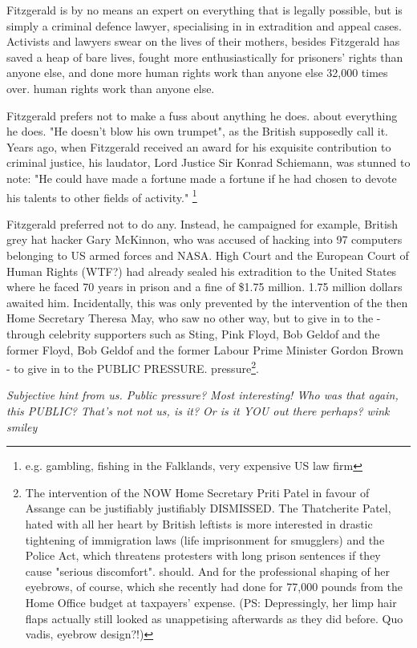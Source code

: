 \begin{multicols}{2}
Fitzgerald is by no means an expert on everything that is legally
possible, but is simply a criminal defence lawyer, specialising in
in extradition and appeal cases. Activists and
lawyers swear on the lives of their mothers, besides
Fitzgerald has saved a heap of bare lives, fought more enthusiastically for prisoners' rights than anyone else, and done more human rights work than anyone else 32,000 times over.
human rights work than anyone else.

Fitzgerald prefers not to make a fuss about anything he does.
about everything he does. "He doesn't blow his own trumpet", as the British supposedly call it. Years ago, when Fitzgerald received an award for his exquisite
contribution to criminal justice, his laudator, Lord
Justice Sir Konrad Schiemann, was stunned to note: "He could have made a fortune
made a fortune if he had chosen to devote his talents to other fields of activity."
\footnote[12]{e.g. gambling, fishing in the Falklands, very expensive US law firm}

Fitzgerald preferred not to do any. Instead, he campaigned
for example, British grey hat hacker Gary McKinnon, who was accused of hacking into 97 computers belonging to
US armed forces and NASA. High
Court and the European Court of Human Rights (WTF?) had already sealed his extradition to the United States
where he faced 70 years in prison and a fine of \$1.75 million.
1.75 million dollars awaited him. Incidentally, this was only prevented by the intervention of the then Home Secretary Theresa May, who saw no other way,
but to give in to the - through celebrity supporters such as Sting, Pink Floyd, Bob Geldof and the former
Floyd, Bob Geldof and the former Labour Prime Minister Gordon Brown - to give in to the PUBLIC PRESSURE.
pressure\footnote[13]{The intervention of the NOW Home Secretary Priti Patel in favour of Assange can be justifiably
justifiably DISMISSED. The Thatcherite Patel, hated with all her heart by British leftists
is more interested in drastic tightening of immigration laws (life imprisonment for smugglers) and the Police Act, which threatens protesters with long prison sentences if they cause "serious discomfort".
should. And for the professional shaping of her eyebrows, of course, which she recently had done for 77,000 pounds
from the Home Office budget at taxpayers' expense.
(PS: Depressingly, her limp hair flaps actually still looked as unappetising afterwards as they did before. Quo vadis, eyebrow design?!)}.

\textit{Subjective hint from us.
Public pressure? Most interesting! Who was
that again, this PUBLIC? That's not
not us, is it? Or is it YOU out there perhaps? wink smiley}


\end{multicols}
